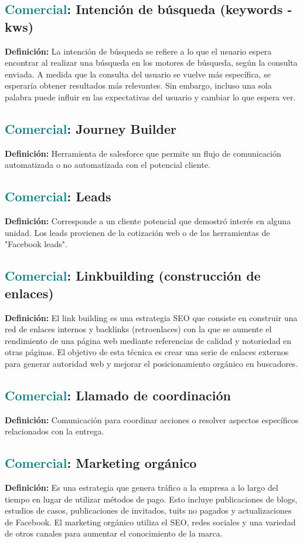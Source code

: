 \documentclass[12pt]{article}
\begin{document}
\subsection{\textcolor{teal}{Comercial}: Intención de búsqueda (keywords - kws)}
\textbf{Definición:} La intención de búsqueda se refiere a lo que el usuario espera encontrar al realizar una búsqueda en los motores de búsqueda, según la consulta enviada. A medida que la consulta del usuario se vuelve más específica, se esperaría obtener resultados más relevantes. Sin embargo, incluso una sola palabra puede influir en las expectativas del usuario y cambiar lo que espera ver.
\subsection{\textcolor{teal}{Comercial}: Journey Builder}
\textbf{Definición:} Herramienta de salesforce que permite un flujo de comunicación automatizada o no automatizada con el potencial cliente.
\subsection{\textcolor{teal}{Comercial}: Leads}
\textbf{Definición:} Corresponde a un cliente potencial que demostró interés en alguna unidad. Los leads provienen de la cotización web o de las herramientas de "Facebook leads". 
\subsection{\textcolor{teal}{Comercial}: Linkbuilding (construcción de enlaces)}
\textbf{Definición:} El link building es una estrategia SEO que consiste en construir una red de enlaces internos y backlinks (retroenlaces) con la que se aumente el rendimiento de una página web mediante referencias de calidad y notoriedad en otras páginas. El objetivo de esta técnica es crear una serie de enlaces externos para generar autoridad web y mejorar el posicionamiento orgánico en buscadores.
\subsection{\textcolor{teal}{Comercial}: Llamado de coordinación}
\textbf{Definición:} Comunicación para coordinar acciones o resolver aspectos específicos relacionados con la entrega.
\subsection{\textcolor{teal}{Comercial}: Marketing orgánico}
\textbf{Definición:} Es una estrategia que genera tráfico a la empresa a lo largo del tiempo en lugar de utilizar métodos de pago. Esto incluye publicaciones de blogs, estudios de casos, publicaciones de invitados, tuits no pagados y actualizaciones de Facebook. El marketing orgánico utiliza el SEO, redes sociales y una variedad de otros canales para aumentar el conocimiento de la marca.
\end{document}
